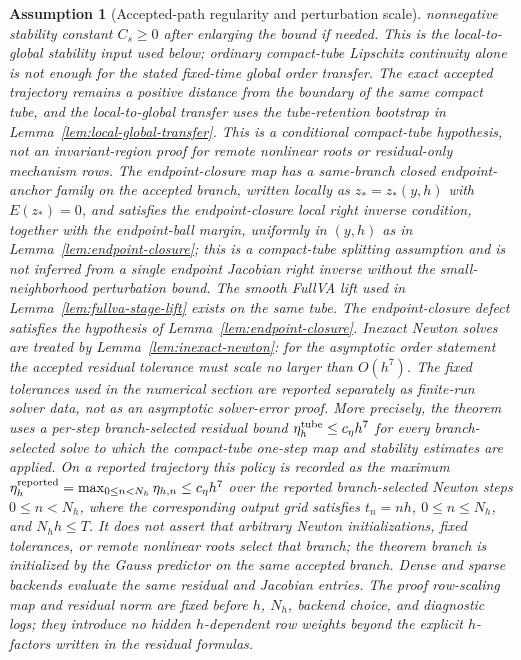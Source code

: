 \documentclass[preprint,12pt]{elsarticle}
\newtheorem{assumption}{Assumption}
\begin{document}
\begin{assumption}[Accepted-path regularity and perturbation scale]
nonnegative stability constant \(C_s\ge0\) after enlarging the bound if
needed. This is the local-to-global stability input used below; ordinary
compact-tube Lipschitz continuity alone is not enough for the stated
fixed-time global order transfer. The exact accepted trajectory remains a
positive distance from the boundary of the same compact tube, and the
local-to-global transfer uses the tube-retention bootstrap in
Lemma~\ref{lem:local-global-transfer}.
This is a conditional compact-tube hypothesis, not an invariant-region proof
for remote nonlinear roots or residual-only mechanism rows. The
endpoint-closure map has a same-branch closed endpoint-anchor family on the
accepted branch, written locally as \(z_\ast=z_\ast(y,h)\) with
\(E(z_\ast)=0\), and satisfies the endpoint-closure local right inverse
condition, together with the endpoint-ball margin, uniformly in \((y,h)\) as in
Lemma~\ref{lem:endpoint-closure}; this is a compact-tube splitting assumption
and is not inferred from a single endpoint Jacobian right inverse without the
small-neighborhood perturbation bound. The smooth FullVA lift used in
Lemma~\ref{lem:fullva-stage-lift} exists on the same tube. The
endpoint-closure defect satisfies the hypothesis of
Lemma~\ref{lem:endpoint-closure}. Inexact Newton solves are treated by
Lemma~\ref{lem:inexact-newton}: for the asymptotic order statement the
accepted residual tolerance must scale no larger than $O(h^7)$. The fixed
tolerances used in the numerical section are reported separately as finite-run
solver data, not as an asymptotic solver-error proof. More precisely, the
theorem uses a per-step branch-selected residual bound
\(\eta_h^{\rm tube}\le c_\eta h^7\) for every branch-selected solve to
which the compact-tube one-step map and stability estimates are applied. On a
reported trajectory this policy is recorded as the maximum
\(\eta_h^{\rm reported}=\max_{0\le n<N_h}\eta_{h,n}\le c_\eta h^7\) over the reported
branch-selected Newton steps \(0\le n<N_h\), where the corresponding output
grid satisfies \(t_n=n h\), \(0\le n\le N_h\), and \(N_hh\le T\). It does
not assert that arbitrary Newton initializations, fixed tolerances, or remote
nonlinear roots select that branch; the theorem branch is initialized by the
Gauss predictor on the same accepted branch. Dense and sparse backends
evaluate the same residual and Jacobian entries. The proof row-scaling map
and residual norm are fixed before \(h\), \(N_h\), backend choice, and
diagnostic logs; they introduce no hidden \(h\)-dependent row weights beyond
the explicit \(h\)-factors written in the residual formulas.

\end{assumption}
\end{document}

